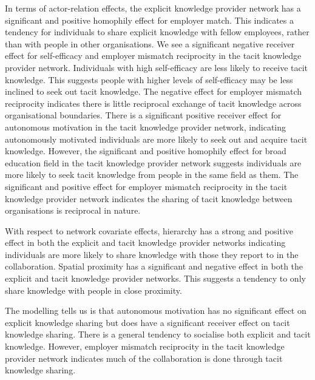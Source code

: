 In terms of actor-relation effects, the explicit knowledge provider network has a significant and positive homophily effect for employer match. This indicates a tendency for individuals to share explicit knowledge with fellow employees, rather than with people in other organisations. We see a significant negative receiver effect for self-efficacy and employer mismatch reciprocity in the tacit knowledge provider network. Individuals with high self-efficacy are less likely to receive tacit knowledge. This suggests people with higher levels of self-efficacy may be less inclined to seek out tacit knowledge. The negative effect for employer mismatch reciprocity indicates there is little reciprocal exchange of tacit knowledge across organisational boundaries. There is a significant positive receiver effect for autonomous motivation in the tacit knowledge provider network, indicating autonomously motivated individuals are more likely to seek out and acquire tacit knowledge. However, the significant and positive homophily effect for broad education field in the tacit knowledge provider network suggests individuals are more likely to seek tacit knowledge from people in the same field as them. The significant and positive effect for employer mismatch reciprocity in the tacit knowledge provider network indicates the sharing of tacit knowledge between organisations is reciprocal in nature. \medskip

With respect to network covariate effects, hierarchy has a strong and positive effect in both the explicit and tacit knowledge provider networks indicating individuals are more likely to share knowledge with those they report to in the collaboration. Spatial proximity has a significant and negative effect in both the explicit and tacit knowledge provider networks. This suggests a tendency to only share knowledge with people in close proximity.\medskip

The modelling tells us is that autonomous motivation has no significant effect on explicit knowledge sharing but does have a significant receiver effect on tacit knowledge sharing. There is a general tendency to socialise both explicit and tacit knowledge. However, employer mismatch reciprocity in the tacit knowledge provider network indicates much of the collaboration is done through tacit knowledge sharing.\medskip


